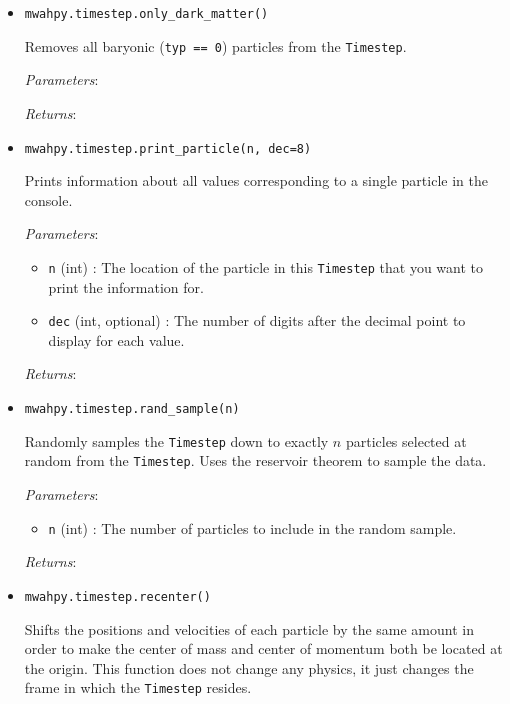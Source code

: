 \documentclass{article}
\begin{document}
\begin{itemize}
\item \verb!mwahpy.timestep.only_dark_matter()!

Removes all baryonic (\verb!typ == 0!) particles from the \verb!Timestep!.

\textit{Parameters}: 

\textit{Returns}: 



\item \verb!mwahpy.timestep.print_particle(n, dec=8)!

Prints information about all values corresponding to a single particle in the console. 

\textit{Parameters}: \begin{itemize}

\item \verb!n! (int) : The location of the particle in this \verb!Timestep! that you want to print the information for. 

\item \verb!dec! (int, optional) : The number of digits after the decimal point to display for each value. 

\end{itemize}

\textit{Returns}: 



\item \verb!mwahpy.timestep.rand_sample(n)!

Randomly samples the \verb!Timestep! down to exactly $n$ particles selected at random from the \verb!Timestep!. Uses the reservoir theorem to sample the data.

\textit{Parameters}: \begin{itemize}

\item \verb!n! (int) : The number of particles to include in the random sample.

\end{itemize}

\textit{Returns}: 



\item \verb!mwahpy.timestep.recenter()!

Shifts the positions and velocities of each particle by the same amount in order to make the center of mass and center of momentum both be located at the origin. This function does not change any physics, it just changes the frame in which the \verb!Timestep! resides.


\end{itemize}
\end{document}
